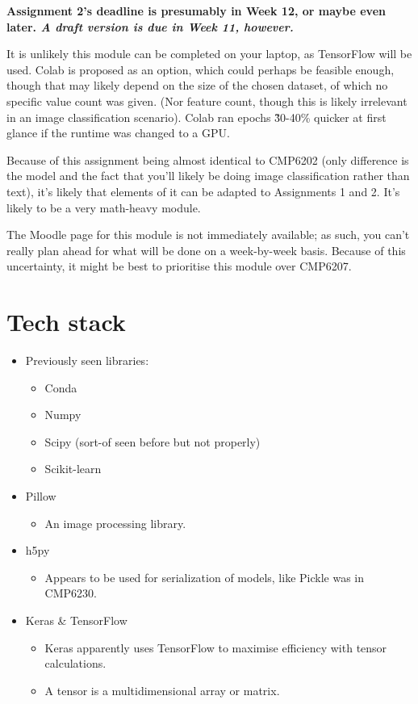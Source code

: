\documentclass[12pt]{report}
\newcommand{\para}{\vspace{7pt}\noindent}
\begin{document}
\para \textbf{Assignment 2's deadline is presumably in Week 12, or maybe even later. 
\textit{A draft version is due in Week 11, however.} } 

\para It is unlikely this module can be completed on your laptop, as TensorFlow 
will be used. Colab is proposed as an option, which could perhaps be feasible enough, though 
that may likely depend on the size of the chosen dataset, of which no specific value 
count was given. (Nor feature count, though this is likely irrelevant in an image classification scenario).
Colab ran epochs \~30-40\% quicker at first glance if the runtime was changed to a GPU.

\para Because of this assignment being almost identical to CMP6202 (only difference is the model and 
the fact that you'll likely be doing image classification rather than text),
it's likely that elements of it can be adapted to Assignments 1 and 2. It's likely to be a very math-heavy 
module.

\para The Moodle page for this module is not immediately available; as such, you can't really plan ahead 
for what will be done on a week-by-week basis. Because of this uncertainty, it might be best to prioritise 
this module over CMP6207.

\chapter*{Tech stack}
\begin{itemize}
    \item Previously seen libraries:
    \begin{itemize}
        \item Conda 
        \item Numpy
        \item Scipy (sort-of seen before but not properly)
        \item Scikit-learn 
    \end{itemize}
    \item Pillow
    \begin{itemize}
        \item An image processing library.
    \end{itemize}
    \item h5py
    \begin{itemize}
        \item Appears to be used for serialization of models, like Pickle was in CMP6230.
    \end{itemize}
    \item Keras \& TensorFlow
    \begin{itemize}
        \item Keras apparently uses TensorFlow to maximise efficiency with tensor calculations.
        \item A tensor is a multidimensional array or matrix.
    \end{itemize}
\end{itemize}
\end{document}
